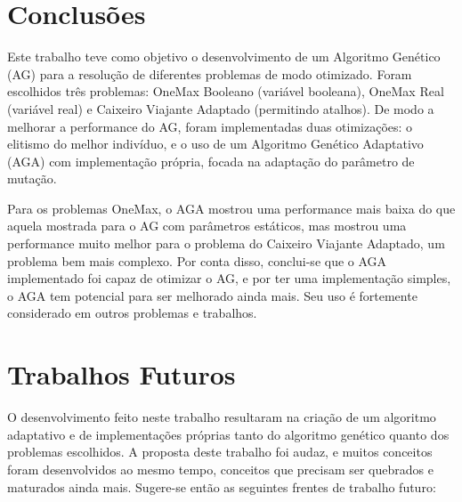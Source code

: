 \label{6_conclusoes}

\section{Conclusões}

Este trabalho teve como objetivo o desenvolvimento de um Algoritmo Genético (AG) para a resolução de diferentes problemas de modo otimizado. Foram escolhidos três problemas: OneMax Booleano (variável booleana), OneMax Real (variável real) e Caixeiro Viajante Adaptado (permitindo atalhos). De modo a melhorar a performance do AG, foram implementadas duas otimizações: o elitismo do melhor indivíduo, e o uso de um Algoritmo Genético Adaptativo (AGA) com implementação própria, focada na adaptação do parâmetro de mutação.

Para os problemas OneMax, o AGA mostrou uma performance mais baixa do que aquela mostrada para o AG com parâmetros estáticos, mas mostrou uma performance muito melhor para o problema do Caixeiro Viajante Adaptado, um problema bem mais complexo. Por conta disso, conclui-se que o AGA implementado foi capaz de otimizar o AG, e por ter uma implementação simples, o AGA tem potencial para ser melhorado ainda mais. Seu uso é fortemente considerado em outros problemas e trabalhos.

\section{Trabalhos Futuros}

O desenvolvimento feito neste trabalho resultaram na criação de um algoritmo adaptativo e de implementações próprias tanto do algoritmo genético quanto dos problemas escolhidos. A proposta deste trabalho foi audaz, e muitos conceitos foram desenvolvidos ao mesmo tempo, conceitos que precisam ser quebrados e maturados ainda mais. Sugere-se então as seguintes frentes de trabalho futuro:

